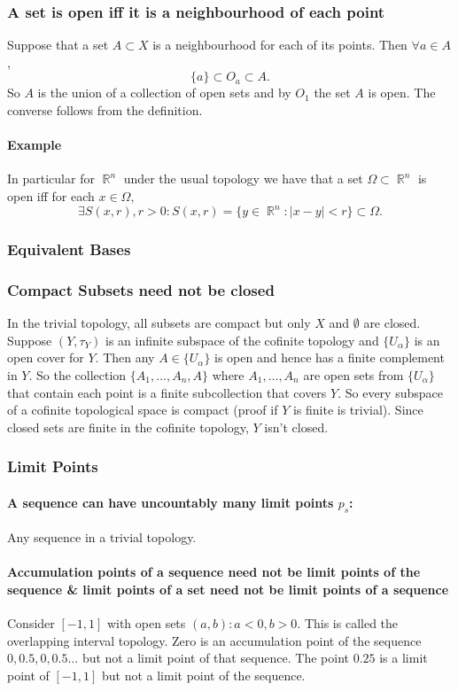 \documentclass{article}
\DeclareMathOperator\R{\mathbb{R}}
\begin{document}
\subsubsection{A set is open iff it is a neighbourhood of each point}
Suppose that a set $A \subset X$ is a neighbourhood for each of its points. Then
$\forall a \in A$,
$$
\{ a \} \subset O_a \subset A.
$$
So $A$ is the union of a collection of open sets and by $O_1$ the set $A$ is open. The converse follows from the definition.
\paragraph{Example}
In particular for $\R^n$ under the usual topology we have that
a set $\Omega \subset \R^n$ is open iff for each $x \in \Omega,$
$$
\exists S(x,r),r>0:S(x,r) = \{y \in \R^n: |x-y|<r \} \subset \Omega.
$$

\subsubsection{Equivalent Bases}
\subsubsection{Compact Subsets need not be closed}
In the trivial topology, all subsets are compact but only $X$ and $\emptyset$ are closed. Suppose $(Y,\tau_Y)$ is
an infinite subspace of the cofinite topology and $\{U_\alpha\}$ is an open cover for $Y$. Then any $A \in \{U_\alpha\}$ is open and hence
has a finite complement in $Y$. So the collection $\{A_1,\hdots,A_n,A \}$ where $A_1,\hdots, A_n$ are open sets from $\{U_\alpha\}$ that contain each point is a finite subcollection that covers $Y$.
So every subspace of a cofinite topological space is compact (proof if $Y$ is finite is trivial). Since closed sets are finite in the cofinite topology, $Y$ isn't closed.

\subsubsection{Limit Points}
\paragraph{A sequence can have uncountably many limit points $p_s$:}
Any sequence in a trivial topology.
\paragraph{Accumulation points of a sequence need not be limit points of the sequence \& limit points of a set need not be limit points of a sequence}
Consider $[-1,1]$ with open sets $(a,b):a<0,b>0$. This is called the overlapping interval topology.
Zero is an accumulation point of the sequence $0,0.5,0,0.5\hdots$ but not a limit point of that sequence.
The point $0.25$ is a limit point of $[-1,1]$ but not a limit point of the sequence.
\end{document}
